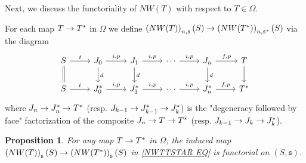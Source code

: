 \documentclass[a4paper,10pt
,draft
]{article}%
\numberwithin{equation}{section}
\numberwithin{figure}{section}
\newtheorem{proposition}[equation]{Proposition}%
\theoremstyle{definition} %
\newcommand{\1}{\ensuremath{\mathbbm 1}}%
\begin{document}
Next, we discuss the functoriality of
$NW(T)$ with respect to $T \in \Omega$.

For each map $T \to T^{\**}$ in $\Omega$
we define
$\left(NW(T)\right)_{n,\mathfrak{s}}(S)
	\to 
\left(NW(T^{\**})\right)_{n,\mathfrak{s}^{\**}}(S)$
via the diagram
\begin{equation}\label{NWTTSTAR EQ}
\begin{tikzcd}
	S \ar{r}{t} \ar[equal]{d}
&
	J_0 \ar{r}{i,p} \ar{d}{d}
&
	J_1 \ar{r}{i,p} \ar{d}{d}
&
	\cdots \ar{r}{i,p}
&
J_n \ar{r}{f,p} \ar{d}{d}
&
	T \ar{d}
\\
	S \ar{r}{t} 
&
	J^{\**}_0 \ar{r}{i,p}
&
	J^{\**}_1 \ar{r}{i,p}
&
	\cdots \ar{r}{i,p}
&
	J^{\**}_n \ar{r}{f,p}
&
	T^{\**}
\end{tikzcd}
\end{equation}
where
$J_n \to J^{\**}_n \to T^{\**}$
(resp. 
$J_{k-1} \to J^{\**}_{k-1} \to J^{\**}_k$)
is the "degeneracy followed by face"
factorization of the composite
$J_n \to T \to T^{\**}$
(resp.
$J_{k-1} \to J_{k} \to J^{\**}_k$).




\begin{proposition}
        \label{NWTNS_NAT_PROP}
	For any map $T \to T^{\**}$ in $\Omega$, the induced map
	$\left(NW(T)\right)_{\mathfrak{s}}(S)
	\to 
	\left(NW(T^{\**})\right)_{\mathfrak{s}}(S)$
	in 
	\eqref{NWTTSTAR EQ}
	is functorial on $(S,\mathfrak{s})$.
\end{proposition}
\end{document}
